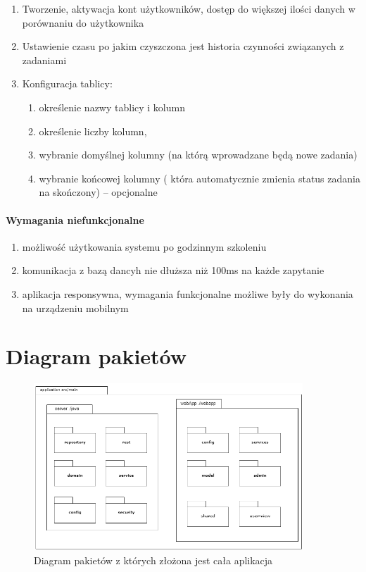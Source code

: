 		\begin{enumerate} 
		\item Tworzenie, aktywacja kont użytkowników, dostęp do większej ilości danych w porównaniu do użytkownika
		\item Ustawienie czasu po jakim czyszczona jest historia czynności związanych z zadaniami 
		\item Konfiguracja tablicy:
	\begin{enumerate}[leftmargin=3em]
			\item określenie nazwy tablicy i kolumn
			\item określenie liczby kolumn, 
			\item wybranie domyślnej kolumny (na którą wprowadzane będą nowe zadania)
			\item wybranie końcowej kolumny ( która automatycznie zmienia status zadania na skończony) –  opcjonalne
		\end{enumerate}

\end{enumerate}

\paragraph{Wymagania niefunkcjonalne}
\begin{enumerate}
	\item możliwość użytkowania systemu po godzinnym szkoleniu
	\item komunikacja z bazą dancyh nie dłuższa niż 100ms na każde zapytanie 
	\item aplikacja responsywna, wymagania funkcjonalne możliwe były do wykonania na urządzeniu mobilnym
\end{enumerate}

\clearpage
\section{Diagram pakietów}


\begin{figure}[h]
	
	\centering
	\includegraphics[width=0.90\textwidth]{pakiety}		
	\caption{Diagram pakietów z których złożona jest cała aplikacja }
	\label{pakiet}
\end{figure}

